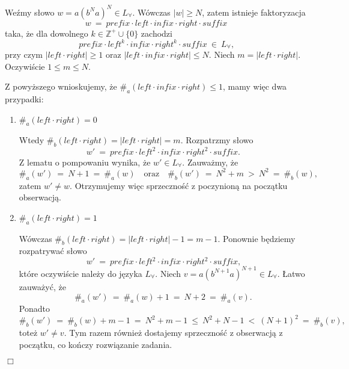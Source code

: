 \documentclass[12pt]{article}
\begin{document}
	Weźmy słowo \(w = a \left( b^{N} a \right) ^ {N} \in L_{\forall}\). Wówczas
	\(|w| \geqslant N\), zatem istnieje faktoryzacja
	\[ w \ = \ prefix \cdot left \cdot infix \cdot right \cdot suffix \]
	taka, że dla dowolnego \(k \in \mathbb{Z}^{+} \cup \{0\}\) zachodzi
	\[ prefix \cdot left^{k} \cdot infix \cdot right^{k} \cdot suffix \ \in \
	L_{\forall} \text{,} \]
	przy czym \(\left| left \cdot right \right| \geqslant 1\) oraz \(\left| left
	\cdot infix \cdot right \right| \leqslant N\). Niech \(m = \left| left \cdot
	right \right|\). Oczywiście \(1 \leqslant m \leqslant N\).
	
	\medskip
	
	Z powyższego wnioskujemy, że
	\(\#_{a} \left( left \cdot infix \cdot right \right) \leqslant 1\), mamy
	więc dwa przypadki:
	\begin{enumerate}
		\item \(\#_{a} \left( left \cdot right \right) = 0\)
		      
		      Wtedy \(\#_{b} \left( left \cdot right \right) = \left| left \cdot
		      right \right| = m\). Rozpatrzmy słowo
		      \[ w' \ = \ prefix \cdot left^{2} \cdot infix \cdot right^{2}
		      \cdot suffix \text{.} \]
		      Z lematu o pompowaniu wynika, że \(w' \in L_{\forall}\). Zauważmy,
		      że
		      \[ \#_{a} \left( w' \right) \ = \ N + 1 \ = \ \#_{a} \left( w
		      \right) \quad \text{oraz} \quad \#_{b} \left( w' \right) \ = \
		      N^{2} + m \ > \ N^{2} \ = \ \#_{b} \left( w \right) \text{,} \]
		      zatem \(w' \neq w\). Otrzymujemy więc sprzeczność z poczynioną
		      na początku obserwacją.
		
		\item \(\#_{a} \left( left \cdot right \right) = 1\)
		      
		      Wówczas \(\#_{b} \left( left \cdot right \right) = \left| left
		      \cdot right \right| - 1 = m - 1\). Ponownie będziemy rozpatrywać
		      słowo
		      \[ w' \ = \ prefix \cdot left^{2} \cdot infix \cdot right^{2}
		      \cdot suffix \text{,} \]
		      które oczywiście należy do języka \(L_{\forall}\). Niech \(v = a
		      \left( b^{N + 1} a \right) ^ {N + 1} \in L_{\forall}\). Łatwo
		      zauważyć, że
		      \[ \#_{a} \left( w' \right) \ = \ \#_{a} \left( w \right) + 1 \ =
		      \ N + 2 \ = \ \#_{a} \left( v \right) \text{.} \]
		      Ponadto
		      \[ \#_{b} \left( w' \right) \ = \ \#_{b} \left( w \right) + m - 1
		      \ = \ N^{2} + m - 1 \ \leqslant \ N^2 + N - 1 \ < \ \left( N + 1
		      \right) ^ {2} \ = \ \#_{b} \left( v \right) \text{,} \]
		      toteż \(w' \neq v\). Tym razem również dostajemy sprzeczność z
		      obserwacją z początku, co kończy rozwiązanie zadania.
	\end{enumerate}
	\begin{flushright}
		\(\Box\)
	\end{flushright}
\end{document}
